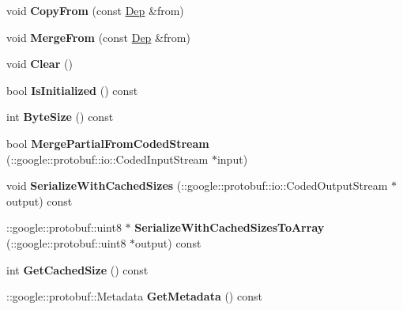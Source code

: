 \begin{DoxyCompactItemize}
\item 
\hypertarget{classDep_a9c5e702a5cafd5a8bdf72ef36d754d27}{
void {\bfseries CopyFrom} (const \hyperlink{classDep}{Dep} \&from)}
\label{classDep_a9c5e702a5cafd5a8bdf72ef36d754d27}

\item 
\hypertarget{classDep_ad104b852e4e4e46eaa50d376b19fe83d}{
void {\bfseries MergeFrom} (const \hyperlink{classDep}{Dep} \&from)}
\label{classDep_ad104b852e4e4e46eaa50d376b19fe83d}

\item 
\hypertarget{classDep_a1713906a00ff37953c363bdbc07cbd54}{
void {\bfseries Clear} ()}
\label{classDep_a1713906a00ff37953c363bdbc07cbd54}

\item 
\hypertarget{classDep_ae39f86aae19b958824fd94b0092e07c9}{
bool {\bfseries IsInitialized} () const }
\label{classDep_ae39f86aae19b958824fd94b0092e07c9}

\item 
\hypertarget{classDep_af27fc8c7ab40a5ad63e3908db600fc5c}{
int {\bfseries ByteSize} () const }
\label{classDep_af27fc8c7ab40a5ad63e3908db600fc5c}

\item 
\hypertarget{classDep_a2080b72b2b01ff368d85506bfc311e28}{
bool {\bfseries MergePartialFromCodedStream} (::google::protobuf::io::CodedInputStream $\ast$input)}
\label{classDep_a2080b72b2b01ff368d85506bfc311e28}

\item 
\hypertarget{classDep_a1c5ffae565cd93485ba1b7de07678efc}{
void {\bfseries SerializeWithCachedSizes} (::google::protobuf::io::CodedOutputStream $\ast$output) const }
\label{classDep_a1c5ffae565cd93485ba1b7de07678efc}

\item 
\hypertarget{classDep_a302a9df44af045d0f56ef4e14ee97816}{
::google::protobuf::uint8 $\ast$ {\bfseries SerializeWithCachedSizesToArray} (::google::protobuf::uint8 $\ast$output) const }
\label{classDep_a302a9df44af045d0f56ef4e14ee97816}

\item 
\hypertarget{classDep_a0574f835da4e18501475c30e0b38ba20}{
int {\bfseries GetCachedSize} () const }
\label{classDep_a0574f835da4e18501475c30e0b38ba20}

\item 
\hypertarget{classDep_acadc4712c5930d210c03df3d288358a9}{
::google::protobuf::Metadata {\bfseries GetMetadata} () const }
\label{classDep_acadc4712c5930d210c03df3d288358a9}


\end{DoxyCompactItemize}

